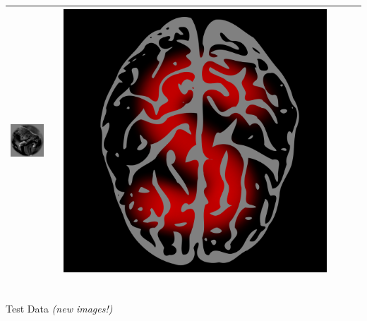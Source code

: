 \documentclass{beamer}
\begin{document}
\begin{frame}
\begin{center}
\begin{tabular}{ccc||ccc}
\includegraphics[scale = .26]{img4.png} & \hspace{0.2in} & \includegraphics[scale = 0.035]{brain5.png} \\ \hline
\end{tabular}\\
\vspace{0.1in}
Test Data \emph{(new images!)} \\
\begin{tabular}{c||c||c|c}
\hline


\end{tabular}
\end{center}
\end{frame}
\end{document}
